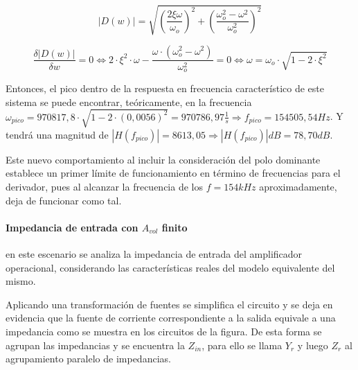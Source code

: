 \begin{equation*}
	|D(w)| = \sqrt{\left( \frac{2 \xi \omega}{\omega_o} \right)^{2} + \left( \frac{\omega_o^{2} - \omega^{2}}{\omega_o^{2}} \right)^{2}}
\end{equation*}

\begin{equation}
	\frac{\delta |D(w)|}{\delta w}
	= 0 \Leftrightarrow 2 \cdot \xi^{2} \cdot \omega - \frac{\omega \cdot (\omega_o^{2} - \omega^{2})}{\omega_o^{2}} = 0
	\Leftrightarrow
	\omega = \omega_o \cdot \sqrt{1 - 2 \cdot \xi^{2}}
\end{equation}

Entonces, el pico dentro de la respuesta en frecuencia caracter\'istico de este sistema se puede encontrar, te\'oricamente, en la frecuencia $\omega_{pico} = 970817,8 \cdot \sqrt{1- 2 \cdot (0,0056)^{2}} = 970786,97 \frac{1}{s} \Rightarrow f_{pico} = 154505,54Hz$. Y tendr\'a una magnitud de $|H(f_{pico})| = 8613,05 \Rightarrow |H(f_{pico})|dB = 78,70dB$.

Este nuevo comportamiento al incluir la consideraci\'on del polo dominante establece un primer l\'imite de funcionamiento en t\'ermino de frecuencias para el derivador, pues al alcanzar la frecuencia de los $f = 154kHz$ aproximadamente, deja de funcionar como tal.


\paragraph*{Impedancia de entrada con $A_{vol}$ finito} en este escenario se analiza la impedancia de entrada del amplificador operacional, considerando las caracter\'isticas reales del modelo equivalente del mismo.



Aplicando una transformaci\'on de fuentes se simplifica el circuito y se deja en evidencia que la fuente de corriente correspondiente a la salida equivale a una impedancia como se muestra en los circuitos de la figura. %
De esta forma se agrupan las impedancias y se encuentra la $Z_{in}$, para ello se llama $Y_r$ y luego $Z_r$ al agrupamiento paralelo de impedancias.


